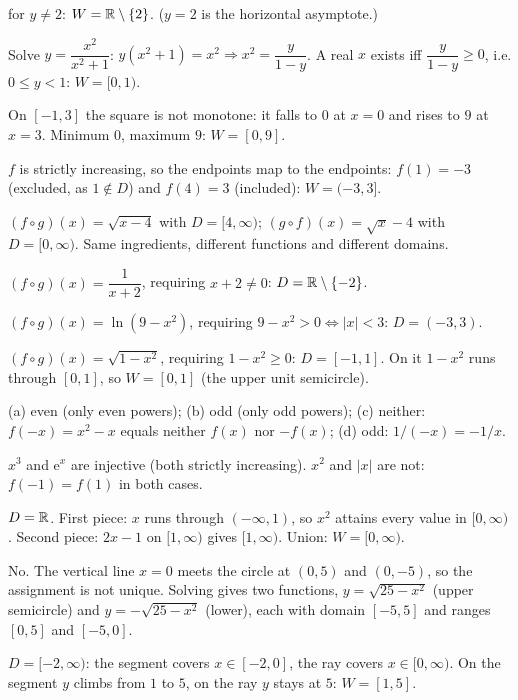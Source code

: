\begin{solutions}
        for $y\neq2$: \;$W=\mathbb{R}\setminus\{2\}$. ($y=2$ is the horizontal
        asymptote.)
  \item Solve $y=\dfrac{x^{2}}{x^{2}+1}$: \;$y(x^{2}+1)=x^{2}\Rightarrow
        x^{2}=\dfrac{y}{1-y}$. A real $x$ exists iff
        $\dfrac{y}{1-y}\geq0$, i.e. $0\leq y<1$: \;$W=[0,1)$.
  \item On $[-1,3]$ the square is not monotone: it falls to $0$ at $x=0$
        and rises to $9$ at $x=3$. Minimum $0$, maximum $9$:
        \;$W=[0,9]$.
  \item $f$ is strictly increasing, so the endpoints map to the endpoints:
        $f(1)=-3$ (excluded, as $1\notin D$) and $f(4)=3$ (included):
        \;$W=(-3,3]$.
  \item $(f\circ g)(x)=\sqrt{x-4}$ with $D=[4,\infty)$;
        $(g\circ f)(x)=\sqrt{x}-4$ with $D=[0,\infty)$. Same ingredients,
        different functions and different domains.
  \item $(f\circ g)(x)=\dfrac{1}{x+2}$, requiring $x+2\neq0$:
        \;$D=\mathbb{R}\setminus\{-2\}$.
  \item $(f\circ g)(x)=\ln(9-x^{2})$, requiring $9-x^{2}>0\iff|x|<3$:
        \;$D=(-3,3)$.
  \item $(f\circ g)(x)=\sqrt{1-x^{2}}$, requiring $1-x^{2}\geq0$:
        \;$D=[-1,1]$. On it $1-x^{2}$ runs through $[0,1]$, so
        $W=[0,1]$ (the upper unit semicircle).
  \item (a) even (only even powers); (b) odd (only odd powers);
        (c) neither: $f(-x)=x^{2}-x$ equals neither $f(x)$ nor $-f(x)$;
        (d) odd: $1/(-x)=-1/x$.
  \item $x^{3}$ and $\mathrm{e}^{x}$ are injective (both strictly
        increasing). $x^{2}$ and $|x|$ are not: $f(-1)=f(1)$ in both cases.
  \item $D=\mathbb{R}$. First piece: $x$ runs through $(-\infty,1)$, so $x^{2}$
        attains every value in $[0,\infty)$. Second piece: $2x-1$ on
        $[1,\infty)$ gives $[1,\infty)$. Union: \;$W=[0,\infty)$.
  \item No. The vertical line $x=0$ meets the circle at $(0,5)$ and
        $(0,-5)$, so the assignment is not unique. Solving gives two
        functions, $y=\sqrt{25-x^{2}}$ (upper semicircle) and
        $y=-\sqrt{25-x^{2}}$ (lower), each with domain $[-5,5]$ and ranges
        $[0,5]$ and $[-5,0]$.
  \item $D=[-2,\infty)$: the segment covers $x\in[-2,0]$, the ray covers
        $x\in[0,\infty)$. On the segment $y$ climbs from $1$ to $5$, on the
        ray $y$ stays at $5$: \;$W=[1,5]$.
\end{solutions}

